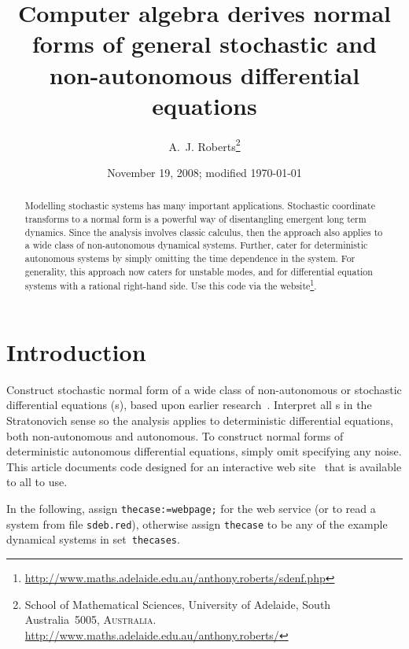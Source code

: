 \documentclass[11pt,a5paper]{article}
\title{Computer algebra derives normal forms of general stochastic and non-autonomous differential equations}
\author{A.~J. Roberts\thanks{School of Mathematical Sciences, University of Adelaide, South Australia~5005, \textsc{Australia}.
\url{http://www.maths.adelaide.edu.au/anthony.roberts/}}}
\date{November 19, 2008; modified \today}
\begin{document}
\maketitle


\begin{abstract}
Modelling stochastic systems has many important applications.
Stochastic coordinate transforms to a normal form is a powerful way of disentangling emergent long term dynamics.
Since the analysis involves classic calculus, then the approach also applies to a wide class of non-autonomous dynamical systems.
Further, cater for deterministic autonomous systems by simply omitting the time dependence in the system.
For generality, this approach now caters for unstable modes, and for differential equation systems with a rational right-hand side.
Use this code via the website\footnote{\url{http://www.maths.adelaide.edu.au/anthony.roberts/sdenf.php}}.
\end{abstract}

\tableofcontents

\section{Introduction}

Construct stochastic normal form of a wide class of non-autonomous or stochastic differential equations (\sde{}s), based upon earlier research~\cite[]{Cox91, Chao95, Roberts06k}.
Interpret all \sde{}s in the Stratonovich sense so the analysis applies to deterministic differential equations, both non-autonomous and autonomous.
To construct normal forms of deterministic autonomous differential equations, simply omit specifying any noise.
This article documents code designed for an interactive web site~\cite[]{Roberts07d} that is available to all to use.


In the following, assign \verb|thecase:=webpage;| for the web service (or to read a system from file \verb|sdeb.red|), otherwise assign \verb|thecase| to be any of the example dynamical systems in set~\verb|thecases|.
\end{document}
